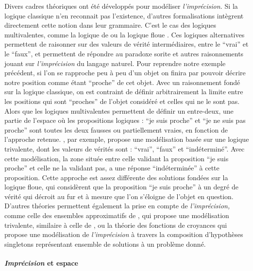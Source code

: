 Divers cadres théoriques ont été développés pour modéliser
\emph{l'imprécision.} Si la logique classique n'en reconnait pas
l'existence, d'autres formalisations intègrent directement cette
notion dans leur grammaire. C'est le cas des logiques multivalentes,
comme la logique de  ou la logique floue
\autocite{Williamson1994,Sorensen2018}. Ces logiques alternatives
permettent de raisonner sur des valeurs de vérité intermédiaires,
entre le \enquote{vrai} et le \enquote{faux}, et permettent de
répondre au paradoxe sorite et autres raisonnements jouant sur
\emph{l'imprécision} du langage naturel. Pour reprendre notre exemple
précédent, si l'on se rapproche peu à peu d'un objet on finira par
pouvoir décrire notre position comme étant \enquote{proche} de cet
objet. Avec un raisonnement fondé sur la logique classique, on est
contraint de définir arbitrairement la limite entre les positions qui
sont \enquote{proches} de l'objet considéré et celles qui ne le sont
pas. Alors que les logiques multivalentes permettent de définir un
entre-deux, une partie de l'espace où les propositions logiques :
\enquote{je suis proche} et \enquote{je ne suis pas proche} sont
toutes les deux fausses ou partiellement vraies, en fonction de
l'approche retenue. \textcite{Tye1994}, par exemple, propose une
modélisation basée sur une logique trivalente, dont les valeurs de
vérités sont : \enquote{vrai}, \enquote{faux} et
\enquote{indéterminé}. Avec cette modélisation, la zone située entre
celle validant la proposition \enquote{je suis proche} et celle ne la
validant pas, a une réponse \enquote{indéterminée} à cette
proposition. Cette approche est assez différente des solutions fondées
sur la logique floue, qui considèrent que la proposition \enquote{je
  suis proche} à un degré de vérité qui décroit au fur et à mesure que
l'on s'éloigne de l'objet en question. D'autres théories permettent
également la prise en compte de \emph{l'imprécision,} comme celle des
ensembles approximatifs de \textcite{Pawlak1982}, qui propose une
modélisation trivalente, similaire à celle de \textcite{Tye1994}
\autocite{Pawlak1997}, ou la théorie des fonctions de croyances
\autocite{Shafer1976} qui propose une modélisation de
\emph{l'imprécision} à travers la composition d'hypothèses singletons
représentant ensemble de solutions à un problème donné.

\paragraph{\emph{Imprécision} et espace}

